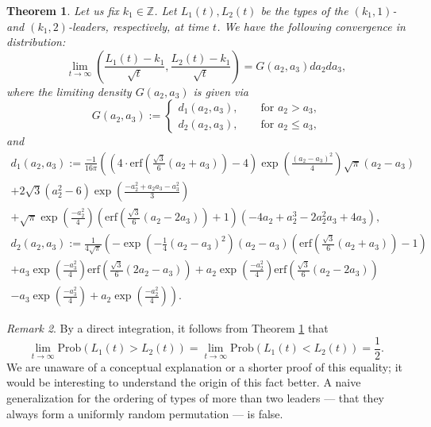 \documentclass[11pt,reqno]{amsart}
\newtheorem{thm}{Theorem}[section]
\theoremstyle{definition}
\theoremstyle{remark}
\newtheorem{rmk}[thm]{Remark}
\theoremstyle{remark}
\def\leq{\leqslant}
\renewcommand\le{\leq}
\def\Z{\mathbb Z}
\numberwithin{equation}{section}
\begin{document}
	\begin{thm}
		\label{th:joint}
		Let us fix $k_1 \in \Z$. Let $L_1 (t), L_2 (t) $ be the types of the $(k_1,1)$- and $(k_1,2)$-leaders, respectively, at time $t$. We have the following convergence in distribution:
		\begin{equation}
			\lim_{t \to \infty} \left( \frac{L_1(t) - k_1}{\sqrt{t}}, \frac{L_2(t) - k_1}{\sqrt{t}} \right) = G (a_2, a_3) d a_2 d a_3,
		\end{equation}
		where the limiting density $G (a_2, a_3)$ is given via
		$$
		G (a_2, a_3) :=
		\begin{cases}
			d_1 (a_2, a_3), \qquad \mbox{for $a_2 > a_3$,} \\
			d_2 (a_2,a_3), \qquad \mbox{for $a_2 \le a_3$,}
		\end{cases}
		$$
		and
		\begin{multline}
			\label{eq:density2a}
			d_1 (a_2,a_3) :=
			\frac{-1}{16 \pi} \left( \left( 4 \cdot \mathrm{erf} \left( \frac{\sqrt{3}}{6} (a_2 +a_3) \right) -4 \right) \exp \left( \frac{(a_2-a_3)^2}{4} \right) \sqrt{\pi} (a_2 - a_3)
			\right. \\ \left. + 2 \sqrt{3} \left( a_2^2 -6 \right) \exp \left( \frac{-a_2^2+a_2 a_3 - a_3^2}{3} \right)
			\right. \\ \left. + \sqrt{\pi} \exp \left( \frac{-a_2^2}{4} \right) \left(  \mathrm{erf} \left( \frac{\sqrt{3}}{6} (a_2 - 2 a_3) \right) +1 \right) \left( - 4 a_2 +a_2^3 - 2 a_2^2 a_3 + 4 a_3 \right) \right. ,
		\end{multline}
		\begin{multline*}
			d_2 (a_2,a_3) := \frac{1}{4 \sqrt{\pi}} \left( - \exp \left( -\frac14 (a_2-a_3)^2 \right) (a_2 - a_3) \left( \mathrm{erf} \left( \frac{\sqrt{3}}{6} (a_2+a_3) \right) -1 \right)
			\right. \\ \left. + a_3 \exp \left( \frac{-a_3^2}{4} \right) \mathrm{erf} \left( \frac{\sqrt{3}}{6} (2 a_2-a_3) \right) +a_2 \exp \left( \frac{-a_2^2}{4} \right) \mathrm{erf} \left( \frac{\sqrt{3}}{6} ( a_2- 2 a_3) \right)
			\right. \\ \left. - a_3 \exp \left( \frac{-a_3^2}{4} \right) + a_2 \exp \left( \frac{-a_2^2}{4} \right) \right).
		\end{multline*}
		
	\end{thm}
	
	\begin{rmk}
		\label{rem:permut}
		By a direct integration, it follows from Theorem \ref{th:joint} that
		$$
		\lim_{t \to \infty} \mathrm{Prob} \left( L_1(t) > L_2 (t) \right) = 
		\lim_{t \to \infty} \mathrm{Prob} \left( L_1(t) < L_2 (t) \right) = \frac12. 
		$$
		We are unaware of a conceptual explanation or a shorter proof of this equality; it would be interesting to understand the origin of this fact better. A naive generalization for the ordering of types of more than two leaders --- that they always form a uniformly random permutation --- is false. 
	\end{rmk}
	
\end{document}
